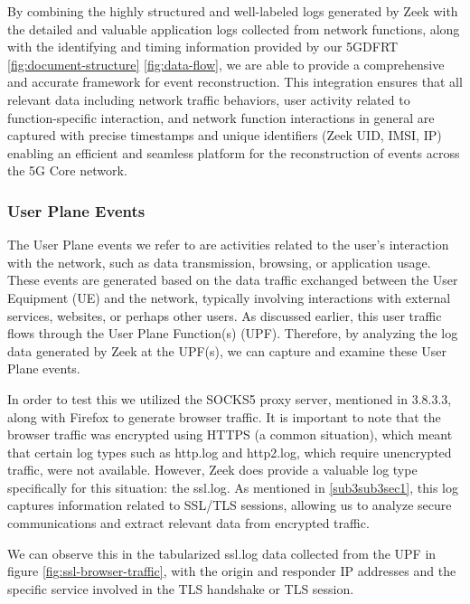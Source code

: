 \documentclass[final,1p,times,authoryear]{elsarticle}
\begin{document}
By combining the highly structured and well-labeled logs generated by Zeek with the detailed and valuable application logs collected from network functions, along with the identifying and timing information provided by our 5GDFRT \ref{fig:document-structure} \ref{fig:data-flow}, we are able to provide a comprehensive and accurate framework for event reconstruction. This integration ensures that all relevant data including network traffic behaviors, user activity related to function-specific interaction, and network function interactions in general are captured with precise timestamps and unique identifiers (Zeek UID, IMSI, IP) enabling an efficient and seamless platform for the reconstruction of events across the 5G Core network.

\subsubsection{User Plane Events}
\label{sub4sub2sec2}
The User Plane events we refer to are activities related to the user's interaction with the network, such as data transmission, browsing, or application usage. These events are generated based on the data traffic exchanged between the User Equipment (UE) and the network, typically involving interactions with external services, websites, or perhaps other users. As discussed earlier, this user traffic flows through the User Plane Function(s) (UPF). Therefore, by analyzing the log data generated by Zeek at the UPF(s), we can capture and examine these User Plane events.

\vspace{1em}

In order to test this we utilized the SOCKS5 proxy server, mentioned in 3.8.3.3, along with Firefox to generate browser traffic. It is important to note that the browser traffic was encrypted using HTTPS (a common situation), which meant that certain log types such as http.log and http2.log, which require unencrypted traffic, were not available. However, Zeek does provide a valuable log type specifically for this situation: the ssl.log. As mentioned in \ref{sub3sub3sec1}, this log captures information related to SSL/TLS sessions, allowing us to analyze secure communications and extract relevant data from encrypted traffic.

\vspace{1em}

We can observe this in the tabularized ssl.log data collected from the UPF in figure \ref{fig:ssl-browser-traffic}, with the origin and responder IP addresses and the specific service involved in the TLS handshake or TLS session.
\end{document}
